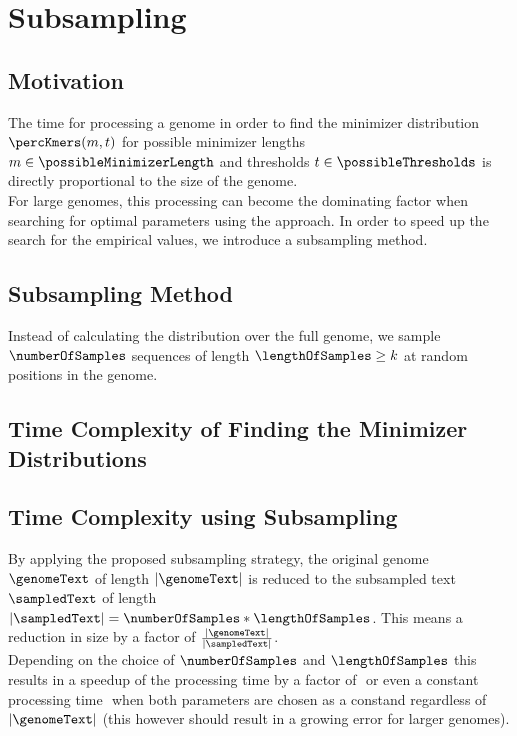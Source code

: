 \chapter{Subsampling}
\section*{Motivation}
The time for processing a genome in order to find the minimizer distribution $\percKmers(m,t)$ for possible minimizer lengths $m \in \possibleMinimizerLength$ and thresholds $t \in \possibleThresholds$ is directly proportional to the size of the genome.\\
For large genomes, this processing can become the dominating factor when searching for optimal parameters using the  approach. In order to speed up the search for the empirical values, we introduce a subsampling method.

\section*{Subsampling Method}
Instead of calculating the distribution over the full genome, we sample $\numberOfSamples$ sequences of length $\lengthOfSamples \geq k$ at random positions in the genome.\\

\section*{Time Complexity of Finding the Minimizer Distributions}

\section*{Time Complexity using Subsampling}
By applying the proposed subsampling strategy, the original genome $\genomeText$ of length $|\genomeText|$ is reduced to the subsampled text $\sampledText$ of length $|\sampledText| = \numberOfSamples * \lengthOfSamples$. This means a reduction in size by a factor of $\frac{|\genomeText|}{|\sampledText|}$.\\
Depending on the choice of $\numberOfSamples$ and $\lengthOfSamples$ this results in a speedup of the processing time by a factor of $ $ or even a constant processing time $ $ when both parameters are chosen as a constand regardless of $|\genomeText|$ (this however should result in a growing error for larger genomes).


